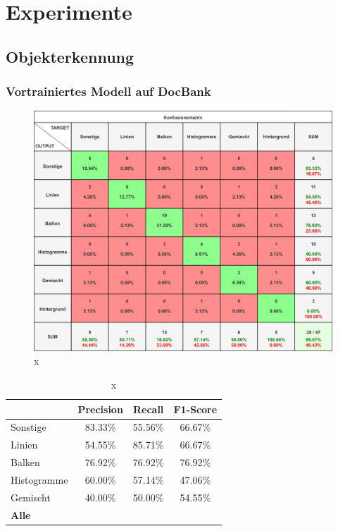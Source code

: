 \chapter{Experimente}
\label{ch:experimente}

\section{Objekterkennung}
\subsection{Vortrainiertes Modell auf DocBank}
\begin{figure}[H]
    \centering
    \captionsetup{width=1\linewidth}
    \includegraphics[width=1\textwidth]{Experimente/img/detect/1_val@0.404_200_histo/konfusionsmatrix.png}
    \caption{ x}
    \label{fig:extraction_output}
\end{figure}

\begin{table}[H]
    \centering
    \begin{tabular}{|l|c|c|c|}
        \hline
        \rowcolor[HTML]{EFEFEF}
                      & Precision & Recall    & F1-Score  \\ \hline
        Sonstige      & 83.33\%   & 55.56\%   & 66.67\%   \\ \hline
        Linien        & 54.55\%   & 85.71\%   & 66.67\%   \\ \hline
        Balken        & 76.92\%   & 76.92\%   & 76.92\%   \\ \hline
        Histogramme   & 60.00\%   & 57.14\%   & 47.06\%   \\ \hline
        Gemischt      & 40.00\%   & 50.00\%   & 54.55\%   \\ \hline
        \textbf{Alle} & \textbf{} & \textbf{} & \textbf{} \\ \hline
    \end{tabular}
    \caption{x}
\end{table}


